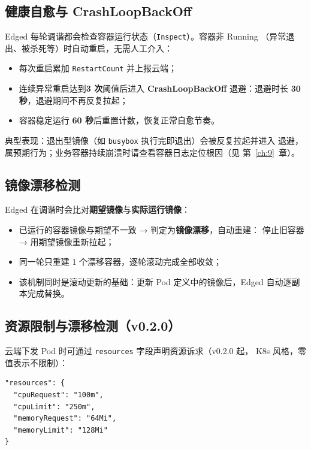\subsection{健康自愈与 CrashLoopBackOff}

Edged 每轮调谐都会检查容器运行状态（\texttt{Inspect}）。容器非 Running
（异常退出、被杀死等）时自动重启，无需人工介入：

\begin{itemize}
  \item 每次重启累加 \texttt{RestartCount} 并上报云端；
  \item 连续异常重启达到\textbf{3 次}阈值后进入 \textbf{CrashLoopBackOff}
        退避：退避时长 \textbf{30 秒}，退避期间不再反复拉起；
  \item 容器稳定运行 \textbf{60 秒}后重置计数，恢复正常自愈节奏。
\end{itemize}

典型表现：退出型镜像（如 \texttt{busybox} 执行完即退出）会被反复拉起并进入
退避，属预期行为；业务容器持续崩溃时请查看容器日志定位根因（见
第~\ref{ch:9}~章）。

\subsection{镜像漂移检测}

Edged 在调谐时会比对\textbf{期望镜像}与\textbf{实际运行镜像}：

\begin{itemize}
  \item 已运行的容器镜像与期望不一致 → 判定为\textbf{镜像漂移}，自动重建：
        停止旧容器 → 用期望镜像重新拉起；
  \item 同一轮只重建 1 个漂移容器，逐轮滚动完成全部收敛；
  \item 该机制同时是滚动更新的基础：更新 Pod 定义中的镜像后，Edged
        自动逐副本完成替换。
\end{itemize}

\subsection{资源限制与漂移检测（v0.2.0）}

云端下发 Pod 时可通过 \texttt{resources} 字段声明资源诉求（v0.2.0 起，
K8s 风格，零值表示不限制）：

\begin{lstlisting}
"resources": {
  "cpuRequest": "100m",
  "cpuLimit": "250m",
  "memoryRequest": "64Mi",
  "memoryLimit": "128Mi"
}
\end{lstlisting}


